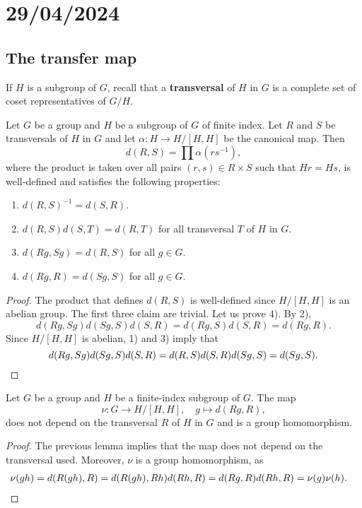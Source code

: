 \section{29/04/2024}

\subsection{The transfer map}

If $H$ is a subgroup of $G$, recall that 
a \textbf{transversal} of $H$ in $G$ is a complete
set of coset representatives of $G/H$. 

\begin{lemma}
	\label{lem:d:transfer}
	Let $G$ be a group and $H$ be a subgroup of $G$ of finite index.  Let $R$
	and $S$ be transversals of $H$ in $G$ and let $\alpha\colon H\to H/[H,H]$
	be the canonical map. Then 
	\[
		d(R,S)=\prod \alpha(rs^{-1}),
	\]
	where the product is taken over all pairs 
	$(r,s)\in R\times S$ such that $Hr=Hs$,
	is well-defined and satisfies the following properties:
	\begin{enumerate}
		\item $d(R,S)^{-1}=d(S,R)$.
		\item $d(R,S)d(S,T)=d(R,T)$ for all transversal $T$ of $H$ in $G$.
		\item $d(Rg,Sg)=d(R,S)$ for all $g\in G$.
		\item $d(Rg,R)=d(Sg,S)$ for all $g\in G$.
	\end{enumerate}
\end{lemma}

\begin{proof}
	The product that defines $d(R,S)$ is well-defined since $H/[H,H]$ is 
	an abelian group. The first three claim are trivial. Let us prove
	4). By 2), 
	\[
		d(Rg,Sg)d(Sg,S)d(S,R)=d(Rg,S)d(S,R)=d(Rg,R).
	\]
	Since $H/[H,H]$ is abelian, 1) and 3) imply that 	
	\[
		d(Rg,Sg)d(Sg,S)d(S,R)=d(R,S)d(S,R)d(Sg,S)=d(Sg,S).\qedhere
	\]
\end{proof}

\begin{theorem}
	\label{thm:transfer}
	Let $G$ be a group and $H$ be a finite-index subgroup of $G$. The map 	
	\[
		\nu\colon G\to H/[H,H],\quad
		g\mapsto d(Rg,R),
	\]
	does not depend on the transversal $R$ of $H$ in $G$ and is a group
	homomorphism. 
\end{theorem}

\begin{proof}
	The previous lemma implies that the map does not depend on the transversal used. 
	Moreover, $\nu$ is a group homomorphism, as 
	\begin{align*}
		\nu(gh)&=d(R(gh),R)
		=d(R(gh),Rh)d(Rh,R)
		=d(Rg,R)d(Rh,R)=\nu(g)\nu(h).\qedhere
	\end{align*}
\end{proof}

